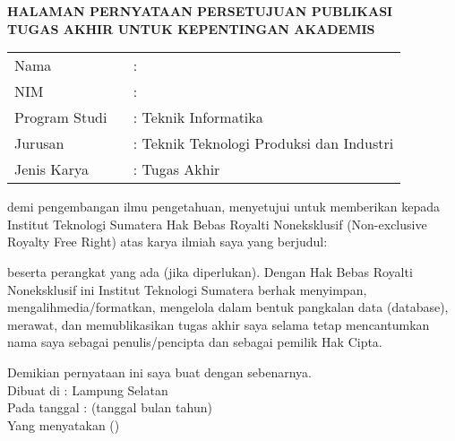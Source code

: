 \clearpage
{}%

\begin{center}
	\smallskip
	
	\normalsize \bfseries \MakeUppercase{
		HALAMAN PERNYATAAN PERSETUJUAN PUBLIKASI \\
		TUGAS AKHIR UNTUK KEPENTINGAN AKADEMIS
	}\linebreak
	
	\normalsize \normalfont \onehalfspacing {}
	
	\flushleft
	\setlength{\tabcolsep}{0pt}
	\begin{tabular}{l l}
		Nama 			&  : \theauthor\\
		NIM 			&  : \printnim\\
		Program Studi \	&  : Teknik Informatika\\
		Jurusan 		&  : Teknik Teknologi Produksi dan Industri\\
		Jenis Karya 	&  : Tugas Akhir\\
	\end{tabular}

	\justifying
	demi pengembangan ilmu pengetahuan, menyetujui untuk memberikan kepada Institut Teknologi Sumatera Hak Bebas Royalti Noneksklusif (Non-exclusive Royalty Free Right) atas karya ilmiah saya yang berjudul: 
	
	\centering
	\thetitle
	
	\justifying
	beserta perangkat yang ada (jika diperlukan). Dengan Hak Bebas Royalti Noneksklusif ini Institut Teknologi Sumatera berhak menyimpan, mengalihmedia/formatkan, mengelola dalam bentuk pangkalan data (database), merawat, dan memublikasikan tugas akhir saya selama tetap mencantumkan nama saya sebagai penulis/pencipta dan sebagai pemilik Hak Cipta.
	
	Demikian pernyataan ini saya buat dengan sebenarnya. \\
	
	\centering
	Dibuat di : Lampung Selatan\\
	Pada tanggal : (tanggal bulan tahun)\\
	\vspace{3cm}
	Yang menyatakan (\theauthor)
	
	
\end{center}
\clearpage
